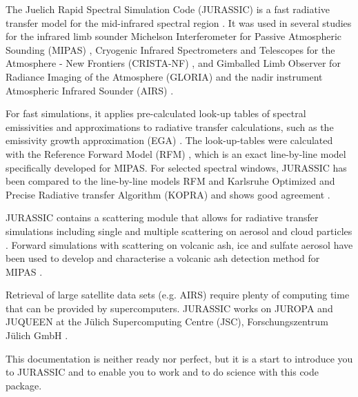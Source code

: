 The Juelich Rapid Spectral Simulation Code (JURASSIC) is a fast radiative transfer model for the mid-infrared spectral region \citep{Hoffmann2006}. It was used in several studies for the infrared limb sounder Michelson Interferometer for Passive Atmospheric Sounding (MIPAS) \citep{Hoffmann2005, Hoffmann2008}, Cryogenic Infrared Spectrometers and Telescopes for the Atmosphere - New Frontiers (CRISTA-NF) \citep{Hoffmann2009, Weigel2010}, and Gimballed Limb Observer for Radiance Imaging of the Atmosphere (GLORIA) \citep{Ungermann2011a} and the nadir instrument Atmospheric Infrared Sounder (AIRS) \citep{Hoffmann2009b, Grimsdell2010,Hoffmann2013}.

For fast simulations, it applies pre-calculated look-up tables of spectral emissivities and approximations to radiative transfer calculations, such as the emissivity growth approximation (EGA) \citep{Weinreb1973,Gordley1981,Marshall1994}.%
The look-up-tables were calculated with the Reference Forward Model (RFM) \citep{Dudhia2002,Dudhia2014}, which is an exact line-by-line model specifically developed for MIPAS. For selected spectral windows, JURASSIC has been compared to the line-by-line models RFM and Karlsruhe Optimized and Precise Radiative transfer Algorithm (KOPRA) \citep{Stiller2000,Stiller2002,Hoepfner2005} and shows good agreement \citep{Griessbach2013}.

JURASSIC contains a scattering module that allows for radiative transfer simulations including single and multiple scattering on aerosol and cloud particles \citep{Griessbach2012,Griessbach2013}. Forward simulations with scattering on volcanic ash, ice and sulfate aerosol have been used to develop and characterise a volcanic ash detection method for MIPAS \citep{Griessbach2012a,Griessbach2014}.

Retrieval of large satellite data sets (e.g. AIRS) require plenty of computing time that can be provided by supercomputers. JURASSIC works on {JUROPA} and {JUQUEEN} at the J\"u{}lich Supercomputing Centre (JSC), Forschungszentrum J\"u{}lich GmbH \citep{Hoffmann2014}.

This documentation is neither ready nor perfect, but it is a start to introduce you to JURASSIC and to enable you to work and to do science with this code package.